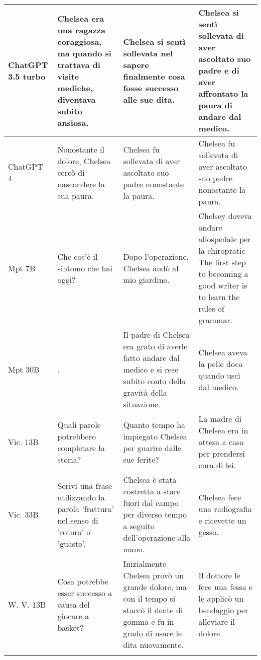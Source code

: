 \begin{center}
\begin{longtable}{l|p{4.5cm}|p{4.5cm}|p{4.5cm}}
ChatGPT 3.5 turbo &  Chelsea era una ragazza coraggiosa, ma quando si trattava di visite mediche, diventava subito ansiosa. &  Chelsea si sentì sollevata nel sapere finalmente cosa fosse successo alle sue dita. &  Chelsea si sentì sollevata di aver ascoltato suo padre e di aver affrontato la paura di andare dal medico. \\ \midrule
ChatGPT 4 &  Nonostante il dolore, Chelsea cercò di nascondere la sua paura. &  Chelsea fu sollevata di aver ascoltato suo padre nonostante la paura. &  Chelsea fu sollevata di aver ascoltato suo padre nonostante la paura. \\ \midrule
Mpt 7B &  Che cos'è il sintomo che hai oggi? &  Dopo l'operazione, Chelsea andò al mio giardino. & Chelsey doveva andare allospedale per la chiropratic The first step to becoming a good writer is to learn the rules of grammar. \\ \midrule
Mpt 30B &  . &  Il padre di Chelsea era grato di averle fatto andare dal medico e si rese subito conto della gravità della situazione. & Chelsea aveva la pelle doca quando uscì dal medico. \\ \midrule
Vic. 13B &  Quali parole potrebbero completare la storia? &  Quanto tempo ha impiegato Chelsea per guarire dalle sue ferite? & La madre di Chelsea era in attesa a casa per prendersi cura di lei. \\ \midrule
Vic. 33B &   Scrivi una frase utilizzando la parola 'frattura' nel senso di 'rotura' o 'guasto'. &  Chelsea è stata costretta a stare fuori dal campo per diverso tempo a seguito dell'operazione alla mano. & Chelsea fece una radiografia e ricevette un gesso. \\ \midrule
W. V. 13B &  Cosa potrebbe esser successo a causa del giocare a basket? &  Inizialmente Chelsea provò un grande dolore, ma con il tempo si staccò il dente di gomma e fu in grado di usare le dita nuovamente. & Il dottore le fece una fessa e le applicò un bendaggio per alleviare il dolore. \\

\arrayrulecolor{black}
\bottomrule
\end{longtable}

\end{center}

